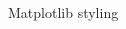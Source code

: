 \documentclass[aspectratio=169]{beamer}
\begin{document}
\begin{frame}{Matplotlib styling}
\begin{columns}
\begin{column}{0.40\textwidth}
        \end{column}
    \end{columns}
\end{frame} 


%
\end{document}
